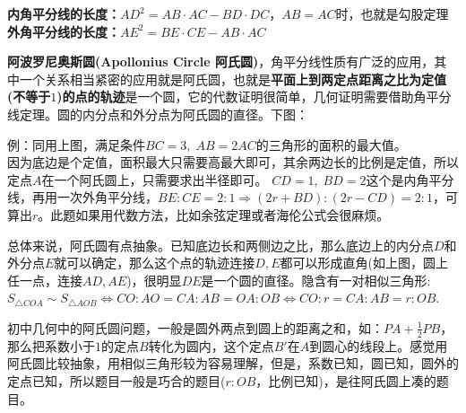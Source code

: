 \documentclass[../main.tex]{subfiles}
\begin{document}
\textbf{内角平分线的长度：}$AD^2=AB\cdot AC-BD\cdot DC$，$AB=AC$时，也就是勾股定理 \\
\textbf{外角平分线的长度：}$AE^2=BE\cdot CE-AB\cdot AC$

\textbf{阿波罗尼奥斯圆(Apollonius Circle 阿氏圆)}，角平分线性质有广泛的应用，其中一个关系相当紧密的应用就是阿氏圆，也就是\textbf{平面上到两定点距离之比为定值(不等于$1$)的点的轨迹}是一个圆，它的代数证明很简单，几何证明需要借助角平分线定理。圆的内分点和外分点为阿氏圆的直径。下图：

\begin{minipage}{1.0\textwidth}
  \centering
\end{minipage}

例：同用上图，满足条件$BC=3, \; AB=2AC$的三角形的面积的最大值。\\
因为底边是个定值，面积最大只需要高最大即可，其余两边长的比例是定值，所以定点$A$在一个阿氏圆上，只需要求出半径即可。
$CD=1, \;BD=2$这个是内角平分线，再用一次外角平分线，$BE:CE=2:1 \Rightarrow (2r+BD):(2r-CD)=2:1$，可算出$r$。此题如果用代数方法，比如余弦定理或者海伦公式会很麻烦。

总体来说，阿氏圆有点抽象。已知底边长和两侧边之比，那么底边上的内分点$D$和外分点$E$就可以确定，那么这个点的轨迹连接$D,E$都可以形成直角(如上图，圆上任一点，连接$AD,AE$)，很明显$DE$是一个圆的直径。隐含有一对相似三角形: $S_{\triangle COA} \sim S_{\triangle AOB} \Leftrightarrow CO:AO=CA:AB=OA:OB \Leftrightarrow CO:r=CA:AB=r:OB$.

初中几何中的阿氏圆问题，一般是圆外两点到圆上的距离之和，如：$PA+\frac{1}{2}PB$，那么把系数小于$1$的定点$B$转化为圆内，这个定点$B'$在$A$到圆心的线段上。感觉用阿氏圆比较抽象，用相似三角形较为容易理解，但是，系数已知，圆已知，圆外的定点已知，所以题目一般是巧合的题目($r:OB$，比例已知)，是往阿氏圆上凑的题目。
\end{document}
